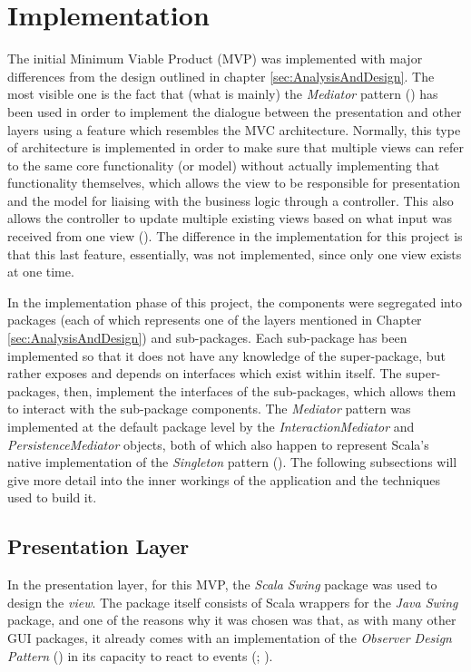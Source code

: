 \section{Implementation} \label{sec:Implementation}

The initial Minimum Viable Product (MVP) was implemented with major
differences from the design outlined in chapter \ref{sec:AnalysisAndDesign}.
The most visible one is the fact that (what is mainly) the \emph{Mediator}
pattern (\cite[][Ch.~9,~Location~3594]{nikolov2016scala}) has been used in
order to implement the dialogue between the presentation and other layers using
a feature which resembles the MVC architecture. Normally, this type of
architecture is implemented in order to make sure that multiple views can refer
to the same core functionality (or model) without actually implementing that
functionality themselves, which allows the view to be responsible for
presentation and the model for liaising with the business logic through a
controller. This also allows the controller to update multiple existing views
based on what input was received from one view
(\cite[][p.~381]{bennett2010object}). The difference in the implementation for
this project is that this last feature, essentially, was not implemented, since
only one view exists at one time.

In the implementation phase of this project, the components were segregated
into packages (each of which represents one of the layers mentioned in Chapter
\ref{sec:AnalysisAndDesign}) and sub-packages. Each sub-package has been
implemented so that it does not have any knowledge of the super-package, but
rather exposes and depends on interfaces which exist within itself. The
super-packages, then, implement the interfaces of the sub-packages, which
allows them to interact with the sub-package components. The \emph{Mediator}
pattern was implemented at the default package level by the
\emph{InteractionMediator} and \emph{PersistenceMediator} objects, both of
which also happen to represent Scala's native implementation of the
\emph{Singleton} pattern (\cite[][Ch.~6,~Location.~2242]{nikolov2016scala}).
The following subsections will give more detail into the inner workings of the
application and the techniques used to build it.

\subsection{Presentation Layer} \label{sec:Implementation.Presentation}
In the presentation layer, for this MVP, the \emph{Scala Swing} package was
used to design the \emph{view}. The package itself consists of Scala wrappers
for the \emph{Java Swing} package, and one of the reasons why it was chosen was
that, as with many other GUI packages, it already comes with an implementation
of the \emph{Observer Design Pattern} (\cite[][p.~293]{gamma1995design}) in its
capacity to react to events (\cite[][p.~5]{maier2009scala};
\cite[][Ch.~9,~Location~3731]{nikolov2016scala}).

